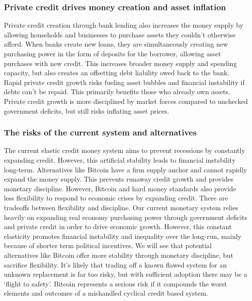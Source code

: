\subsubsection{Private credit drives money creation and asset inflation}

Private credit creation through bank lending also increases the money supply by allowing households and businesses to purchase assets they couldn't otherwise afford.
When banks create new loans, they are simultaneously creating new purchasing power in the form of deposits for the borrower, allowing asset purchases with new credit.
This increases broader money supply and spending capacity, but also creates an offsetting debt liability owed back to the bank.
Rapid private credit growth risks fueling asset bubbles and financial instability if debts can't be repaid. This primarily benefits those who already own assets.
Private credit growth is more disciplined by market forces compared to unchecked government deficits, but still risks inflating asset prices.
\subsubsection{The risks of the current system and alternatives}
The current elastic credit money system aims to prevent recessions by constantly expanding credit. However, this artificial stability leads to financial instability long-term.
Alternatives like Bitcoin have a firm supply anchor and cannot rapidly expand the money supply. This prevents runaway credit growth and provides monetary discipline.
However, Bitcoin and hard money standards also provide less flexibility to respond to economic crises by expanding credit. There are tradeoffs between flexibility and discipline.
Our current monetary system relies heavily on expanding real economy purchasing power through government deficits and private credit in order to drive economic growth. However, this constant elasticity promotes financial instability and inequality over the long-run, mainly because of shorter term political incentives. We will see that potential alternatives like Bitcoin offer more stability through monetary discipline, but sacrifice flexibility. It's likely that trading off a known flawed system for an unknown replacement is far too risky, but with sufficient adoption there may be a `flight to safety'. Bitcoin represents a serious risk if it compounds the worst elements and outcomes of a mishandled cyclical credit based system.
